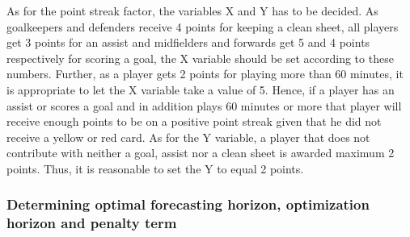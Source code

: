 As for the point streak factor, the variables X and Y has to be decided. As goalkeepers and defenders receive 4 points for keeping a clean sheet, all players get 3 points for an assist and midfielders and forwards get 5 and 4 points respectively for scoring a goal, the X variable should be set according to these numbers. Further, as a player gets 2 points for playing more than 60 minutes, it is appropriate to let the X variable take a value of 5. Hence, if a player has an assist or scores a goal and in addition plays 60 minutes or more that player will receive enough points to be on a positive point streak given that he did not receive a yellow or red card. As for the Y variable, a player that does not contribute with neither a goal, assist nor a clean sheet is awarded maximum 2 points. Thus, it is reasonable to set the Y to equal 2 points. 
\subsubsection{Determining optimal forecasting horizon, optimization horizon and penalty term}

